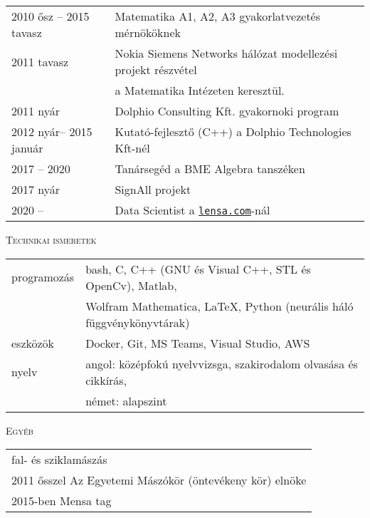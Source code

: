 \documentclass[12pt]{article}
\begin{document}
       \begin{tabular}{p{4cm}l}
	       2010 ősz -- 2015 tavasz & Matematika A1, A2, A3 gyakorlatvezetés mérnököknek\\
           2011 tavasz  & Nokia Siemens Networks hálózat modellezési projekt részvétel\\ & a Matematika Intézeten keresztül. \\
		   2011 nyár    & Dolphio Consulting Kft. gyakornoki program\\
		   2012 nyár-- 2015 január & Kutató-fejlesztő (C++) a Dolphio Technologies Kft-nél \\
           2017 -- 2020 & Tanársegéd a BME Algebra tanszéken \\
           2017 nyár & SignAll projekt \\
           2020 -- & Data Scientist a \href{https://lensa.com/}{\texttt{lensa.com}}-nál
       \end{tabular}
 
 \textsc{Technikai ismeretek}

    \begin{tabular}{p{3cm}l}
	       programozás & bash, C, C++ (GNU és Visual C++, STL és OpenCv), Matlab, \\
                             & Wolfram Mathematica, \LaTeX, Python (neurális háló függvénykönyvtárak) \\
           eszközök & Docker, Git, MS Teams, Visual Studio, AWS \\
           nyelv & angol: középfokú nyelvvizsga, szakirodalom olvasása és cikkírás, \\
                 & német: alapszint
   \end{tabular}
   
 \textsc{Egyéb}
 
    \begin{tabular}{l}
        fal- és sziklamászás\\
        2011 ősszel Az Egyetemi Mászókör (öntevékeny kör) elnöke \\
        2015-ben Mensa tag
   \end{tabular}
\end{document}
